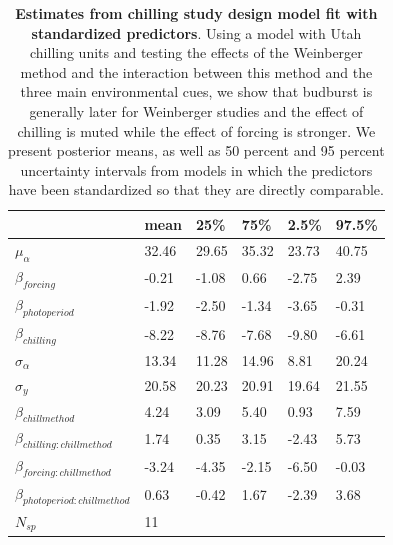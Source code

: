 \documentclass{article}
\begin{document}
\begin{footnotesize}
\begin{table}[ht]
\centering
\caption{\textbf{Estimates from chilling study design model fit with standardized predictors}. Using a model with Utah chilling units and testing the effects of the Weinberger method and the interaction between this method and the three main environmental cues, we show that budburst is generally later for Weinberger studies and the effect of chilling is muted while the effect of forcing is stronger. We present posterior means, as well as 50 percent and 95 percent uncertainty intervals from models in which the predictors have been standardized so that they are directly comparable.} 
\label{tab:methods}
\begingroup\footnotesize
\begin{tabular}{|p{}|p{}p{}p{}p{}p{}|}
  \hline
 & mean & 25\% & 75\% & 2.5\% & 97.5\% \\ 
  \hline
$\mu_{\alpha}$ & 32.46 & 29.65 & 35.32 & 23.73 & 40.75 \\ 
  $\beta_{forcing}$ & -0.21 & -1.08 & 0.66 & -2.75 & 2.39 \\ 
  $\beta_{photoperiod}$ & -1.92 & -2.50 & -1.34 & -3.65 & -0.31 \\ 
  $\beta_{chilling}$ & -8.22 & -8.76 & -7.68 & -9.80 & -6.61 \\ 
  $\sigma_{\alpha}$ & 13.34 & 11.28 & 14.96 & 8.81 & 20.24 \\ 
  $\sigma_{y}$ & 20.58 & 20.23 & 20.91 & 19.64 & 21.55 \\ 
  $\beta_{chillmethod}$ & 4.24 & 3.09 & 5.40 & 0.93 & 7.59 \\ 
  $\beta_{chilling : chillmethod}$ & 1.74 & 0.35 & 3.15 & -2.43 & 5.73 \\ 
  $\beta_{forcing : chillmethod}$ & -3.24 & -4.35 & -2.15 & -6.50 & -0.03 \\ 
  $\beta_{photoperiod : chillmethod}$ & 0.63 & -0.42 & 1.67 & -2.39 & 3.68 \\ 
   \hline
$N_{sp}$ & 11 &  &  &  &  \\ 
   \hline
\end{tabular}
\endgroup
\end{table}


\end{footnotesize}
\end{document}
